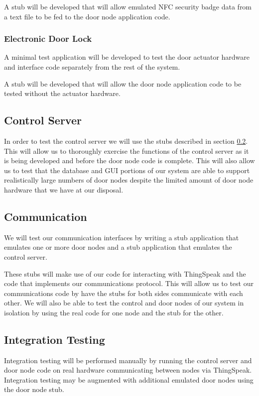 A stub will be developed that will allow emulated NFC security badge data from a
text file to be fed to the door node application code.

\subsubsection{Electronic Door Lock}

A minimal test application will be developed to test the door actuator hardware
and interface code separately from the rest of the system.

A stub will be developed that will allow the door node application code to be
tested without the actuator hardware.

\subsection{Control Server}

In order to test the control server we will use the stubs described in section
\ref{subsec:testing-communication}. This will allow us to thoroughly
exercise the functions of the control server as it is being developed and before
the door node code is complete. This will also allow us to test that the
database and GUI portions of our system are able to support realistically large
numbers of door nodes despite the limited amount of door node hardware that we
have at our disposal.

\subsection{Communication}
\label{subsec:testing-communication}

We will test our communication interfaces by writing a stub application that
emulates one or more door nodes and a stub application that emulates the control
server.

These stubs will make use of our code for interacting with ThingSpeak and the
code that implements our communications protocol. This will allow us to test our
communications code by have the stubs for both sides communicate with each
other. We will also be able to test the control and door nodes of our system in
isolation by using the real code for one node and the stub for the other.

\subsection{Integration Testing}

Integration testing will be performed manually by running the control server and
door node code on real hardware communicating between nodes via ThingSpeak.
Integration testing may be augmented with additional emulated door nodes using
the door node stub.
